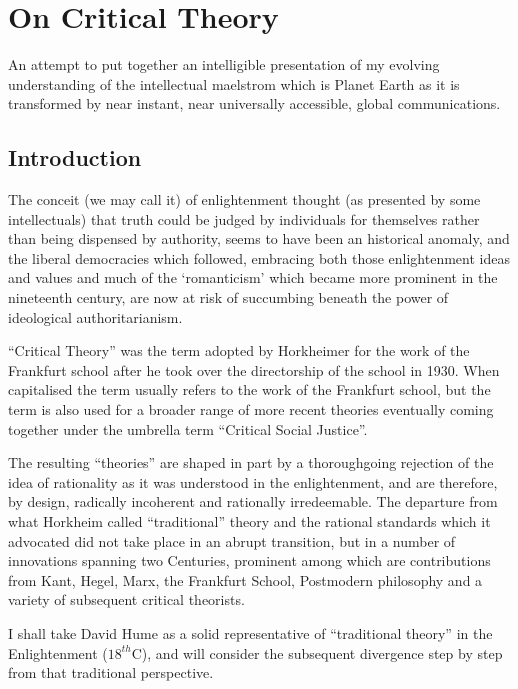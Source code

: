 \documentclass[10pt,titlepage]{book}
\begin{document}
\cite{pinker-angels}

\chapter{On Critical Theory}

An attempt to put together an intelligible presentation of my evolving understanding of the intellectual maelstrom which is Planet Earth as it is transformed by near instant, near universally accessible, global communications.

\section{Introduction}

The conceit (we may call it) of enlightenment thought (as presented by some intellectuals) that truth could be judged by individuals for themselves rather than being dispensed by authority, seems to have been an historical anomaly, and the liberal democracies which followed, embracing both those enlightenment ideas and values and much of the `romanticism' which became more prominent in the nineteenth century, are now at risk of succumbing beneath the power of ideological authoritarianism.


``Critical Theory'' was the term adopted by Horkheimer \cite{horkheimer-trad, horkheimer-crit} for the work of the Frankfurt school after he took over the directorship of the school in 1930.
When capitalised the term usually refers to the work of the Frankfurt school, but the term is also used for a broader range of more recent theories eventually coming together under the umbrella term ``Critical Social Justice''.

The resulting ``theories'' are shaped in part by a thoroughgoing rejection of the idea of rationality as it was understood in the enlightenment, and are therefore, by design, radically incoherent and rationally irredeemable.
The departure from what Horkheim called ``traditional'' theory and the rational standards which it advocated did not take place in an abrupt transition, but in a number of innovations spanning two Centuries, prominent among which are contributions from Kant, Hegel, Marx, the Frankfurt School, Postmodern philosophy and a variety of subsequent critical theorists.

I shall take David Hume as a solid representative of ``traditional theory'' in the Enlightenment ($18^{th}$C), and will consider the subsequent divergence step by step from that traditional perspective.
\end{document}
